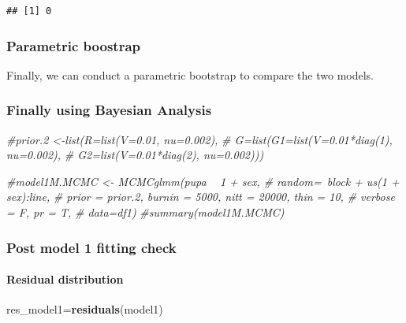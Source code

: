 \documentclass[
]{article}
\newenvironment{Shaded}{\begin{snugshade}}{\end{snugshade}}
\newcommand{\CommentTok}[1]{\textcolor[rgb]{0.56,0.35,0.01}{\textit{#1}}}
\newcommand{\KeywordTok}[1]{\textcolor[rgb]{0.13,0.29,0.53}{\textbf{#1}}}
\newcommand{\NormalTok}[1]{#1}
\begin{document}
\begin{verbatim}
## [1] 0
\end{verbatim}

\hypertarget{parametric-boostrap-1}{%
\subsubsection{Parametric boostrap}\label{parametric-boostrap-1}}

Finally, we can conduct a parametric bootstrap to compare the two
models.

\hypertarget{finally-using-bayesian-analysis-1}{%
\subsubsection{Finally using Bayesian
Analysis}\label{finally-using-bayesian-analysis-1}}

\begin{Shaded}
\begin{Highlighting}[]
\CommentTok{#prior.2 <-list(R=list(V=0.01, nu=0.002), }
\CommentTok{#               G=list(G1=list(V=0.01*diag(1), nu=0.002),}
 \CommentTok{#                     G2=list(V=0.01*diag(2), nu=0.002)))}

\CommentTok{#model1M.MCMC <- MCMCglmm(pupa ~ 1 + sex, }
\CommentTok{#  random=~block + us(1 + sex):line,}
 \CommentTok{# prior = prior.2, burnin = 5000, nitt = 20000, thin = 10,}
\CommentTok{#  verbose = F, pr = T,}
 \CommentTok{# data=df1)}
\CommentTok{#summary(model1M.MCMC)}
\end{Highlighting}
\end{Shaded}

\hypertarget{post-model-1-fitting-check-1}{%
\subsubsection{Post model 1 fitting
check}\label{post-model-1-fitting-check-1}}

\hypertarget{residual-distribution-1}{%
\paragraph{Residual distribution}\label{residual-distribution-1}}

\begin{Shaded}
\begin{Highlighting}[]
\NormalTok{res_model1=}\KeywordTok{residuals}\NormalTok{(model1)}
\end{Highlighting}
\end{Shaded}
\end{document}
